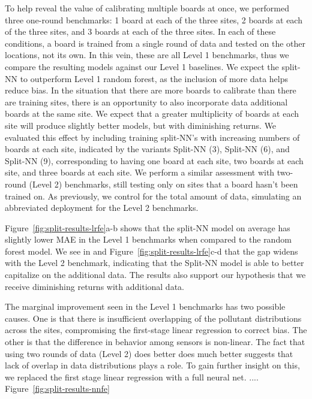 \documentclass[journal abbreviation, manuscript]{copernicus}
\begin{document}
To help reveal the value of calibrating multiple boards at once, we performed three one-round benchmarks: 1 board at each of the three sites, 2 boards at each of the three sites, and 3 boards at each of the three sites.  In each of these conditions, a board is trained from a single round of data and tested on the other locations, not its own.  In this vein, these are all Level 1 benchmarks, thus we compare the resulting models against our Level 1 baselines. We expect the split-NN to outperform Level 1 random forest, as the inclusion of more data helps reduce bias. In the situation that there are more boards to calibrate than there are training sites, there is an opportunity to also incorporate data additional boards at the same site.  We expect that a greater multiplicity of boards at each site will produce slightly better models, but with diminishing returns. We evaluated this effect by including training split-NN's with increasing numbers of boards at each site, indicated by the variants Split-NN (3), Split-NN (6), and Split-NN (9), corresponding to having one board at each site, two boards at each site, and three boards at each site.  We perform a similar assessment with two-round (Level 2) benchmarks, still testing only on sites that a board hasn't been trained on.  As previously, we control for the total amount of data, simulating an abbreviated deployment for the Level 2 benchmarks.

Figure~\ref{fig:split-results-lrfe}a-b shows that the split-NN model on average has slightly lower MAE in the Level 1 benchmarks when compared to the random forest model. We see in and Figure~\ref{fig:split-results-lrfe}c-d that the gap widens with the Level 2 benchmark, indicating that the Split-NN model is able to better capitalize on the additional data. The results also support our hypothesis that we receive diminishing returns with additional data. 

The marginal improvement seen in the Level 1 benchmarks has two possible causes.  One is that there is insufficient overlapping of the pollutant distributions across the sites, compromising the first-stage linear regression to correct bias.  The other is that the difference in behavior among sensors is non-linear.   The fact that using two rounds of data (Level 2) does better does much better suggests that lack of overlap in data distributions plays a role.  To gain further insight on this, we replaced the first stage linear regression with a full neural net.  .... Figure~\ref{fig:split-results-nnfe}
\end{document}
